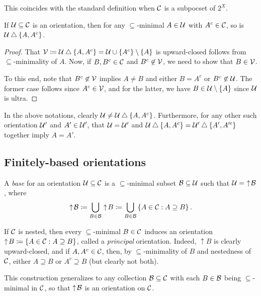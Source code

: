 \documentclass{amsart}
\begin{document}
    \begin{remark}
        This coincides with the standard definition when $\mathcal{C}$ is a subpocset of $2^X$.
    \end{remark}

    \begin{lemma}\label{tree-well-defined}
        If $\mathcal{U}\subseteq\mathcal{C}$ is an orientation, then for any $\subseteq$-minimal $A\in\mathcal{U}$ with $A^c\in\mathcal{C}$, so is $\mathcal{U}\bigtriangleup\left\{A,A^c\right\}$.
    \end{lemma}
    \begin{proof}
        That $\mathcal{V}\coloneqq\mathcal{U}\bigtriangleup\left\{A,A^c\right\}=\mathcal{U}\cup\left\{A^c\right\}\setminus\left\{A\right\}$ is upward-closed follows from $\subseteq$-minimality of $A$. Now, if $B,B^c\in\mathcal{C}$ and $B^c\not\in\mathcal{V}$, we need to show that $B\in\mathcal{V}$.

        To this end, note that $B^c\not\in\mathcal{V}$ implies $A\neq B$ and either $B=A^c$ or $B^c\not\in\mathcal{U}$. The former case follows since $A^c\in\mathcal{V}$, and for the latter, we have $B\in\mathcal{U}\setminus\left\{A\right\}$ since $\mathcal{U}$ is ultra.
    \end{proof}

    \begin{remark}\label{tree-no-loops}
        In the above notations, clearly $\mathcal{U}\neq\mathcal{U}\bigtriangleup\left\{A,A^c\right\}$. Furthermore, for any other such orientation $\mathcal{U}'$ and $A'\in\mathcal{U}'$, that $\mathcal{U}=\mathcal{U}'$ and $\mathcal{U}\bigtriangleup\left\{A,A^c\right\}=\mathcal{U}'\bigtriangleup\left\{A',A'^c\right\}$ together imply $A=A'$.
    \end{remark}

    \subsection{Finitely-based orientations}

    \begin{definition}
        A \textit{base} for an orientation $\mathcal{U}\subseteq\mathcal{C}$ is a $\subseteq$-minimal subset $\mathcal{B}\subseteq\mathcal{U}$ such that $\mathcal{U}=\,\,\uparrow\!\mathcal{B}$, where
        \begin{equation*}
            \uparrow\!\mathcal{B}\coloneqq\bigcup_{B\in\mathcal{B}}\uparrow\!B\coloneqq\bigcup_{B\in\mathcal{B}}\left\{A\in\mathcal{C}: A\supseteq B\right\}.
        \end{equation*}
    \end{definition}

    \begin{remark}
        If $\mathcal{C}$ is nested, then every $\subseteq$-minimal $B\in\mathcal{C}$ induces an orientation $\uparrow\!B\coloneqq\left\{A\in\mathcal{C}: A\supseteq B\right\}$, called a \textit{principal} orientation. Indeed, $\uparrow\!B$ is clearly upward-closed, and if $A,A^c\in\mathcal{C}$, then, by $\subseteq$-minimality of $B$ and nestedness of $\mathcal{C}$, either $A\supseteq B$ or $A^c\supseteq B$ (but clearly not both).

        This construction generalizes to any collection $\mathcal{B}\subseteq\mathcal{C}$ with each $B\in\mathcal{B}$ being $\subseteq$-minimal in $\mathcal{C}$, so that $\uparrow\!\mathcal{B}$ is an orientation on $\mathcal{C}$.
    \end{remark}
\end{document}
